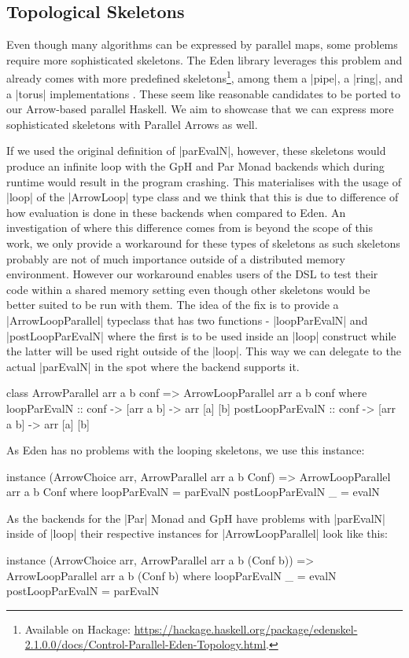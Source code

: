 \subsection{Topological Skeletons}
\label{sec:topology-skeletons}
Even though many algorithms can be expressed by parallel maps, some problems require more sophisticated skeletons. The Eden library leverages this problem and already comes with more predefined skeletons\footnote{Available on Hackage: \url{https://hackage.haskell.org/package/edenskel-2.1.0.0/docs/Control-Parallel-Eden-Topology.html}.}, among them a |pipe|, a |ring|, and a |torus| implementations \citep{Eden:SkeletonBookChapter02}. These seem like reasonable candidates to be ported to our Arrow-based parallel Haskell. We aim to showcase that we can express more sophisticated skeletons with Parallel Arrows as well.

If we used the original definition of |parEvalN|, however, these skeletons would produce an infinite loop with the GpH and Par Monad backends which during runtime would result in the program crashing. This materialises with the usage of |loop| of the |ArrowLoop| type class and we think that this is due to difference of how evaluation is done in these backends when compared to Eden. An investigation of where this difference comes from is beyond the scope of this work, we only provide a workaround for these types of skeletons as such skeletons probably are not of much importance outside of a distributed memory environment. However our workaround enables users of the DSL to test their code within a shared memory setting even though other skeletons would be better suited to be run with them.
The idea of the fix is to provide a |ArrowLoopParallel| typeclass that has two functions - |loopParEvalN| and |postLoopParEvalN| where the first is to be used inside an |loop| construct while the latter will be used right outside of the |loop|. This way we can delegate to the actual |parEvalN| in the spot where the backend supports it.
\begin{code}
class ArrowParallel arr a b conf => ArrowLoopParallel arr a b conf where
    loopParEvalN :: conf -> [arr a b] -> arr [a] [b]
    postLoopParEvalN :: conf -> [arr a b] -> arr [a] [b]
\end{code}
As Eden has no problems with the looping skeletons, we use this instance:
\begin{code}
instance (ArrowChoice arr, ArrowParallel arr a b Conf) => ArrowLoopParallel arr a b Conf where
    loopParEvalN = parEvalN
    postLoopParEvalN _ = evalN
\end{code}
As the backends for the |Par| Monad and GpH have problems with |parEvalN| inside of |loop| their respective instances for |ArrowLoopParallel| look like this:
\begin{code}
instance (ArrowChoice arr, ArrowParallel arr a b (Conf b)) => ArrowLoopParallel arr a b (Conf b) where
    loopParEvalN _ = evalN
    postLoopParEvalN = parEvalN
\end{code}

